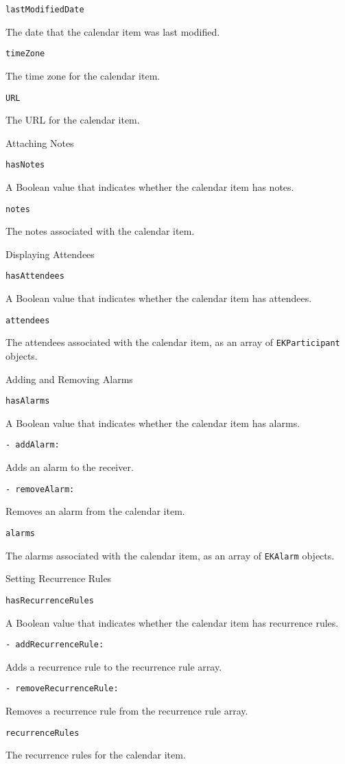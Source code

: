 \documentclass{article}
\begin{document}
\texttt{lastModifiedDate}

The date that the calendar item was last modified.

\texttt{timeZone}

The time zone for the calendar item.

\texttt{URL}

The URL for the calendar item.

Attaching Notes

\texttt{hasNotes}

A Boolean value that indicates whether the calendar item has notes.

\texttt{notes}

The notes associated with the calendar item.

Displaying Attendees

\texttt{hasAttendees}

A Boolean value that indicates whether the calendar item has attendees.

\texttt{attendees}

The attendees associated with the calendar item, as an array of \texttt{EKParticipant} objects.

Adding and Removing Alarms

\texttt{hasAlarms}

A Boolean value that indicates whether the calendar item has alarms.

\texttt{- addAlarm:}

Adds an alarm to the receiver.

\texttt{- removeAlarm:}

Removes an alarm from the calendar item.

\texttt{alarms}

The alarms associated with the calendar item, as an array of \texttt{EKAlarm} objects.

Setting Recurrence Rules

\texttt{hasRecurrenceRules}

A Boolean value that indicates whether the calendar item has recurrence rules.

\texttt{- addRecurrenceRule:}

Adds a recurrence rule to the recurrence rule array.

\texttt{- removeRecurrenceRule:}

Removes a recurrence rule from the recurrence rule array.

\texttt{recurrenceRules}

The recurrence rules for the calendar item.
\end{document}
